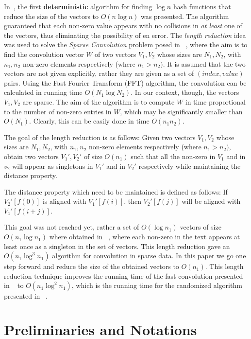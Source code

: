 \documentclass[11pt,amssymb]{article}
\begin{document}
In~\cite{LR07}, the first {\bf deterministic} algorithm for
finding $\log n$ hash functions that reduce the size of the vectors to
$O(n \log n)$ was presented. The algorithm guaranteed that each
non-zero value appears with no collisions in {\em at least} one of the
vectors, thus eliminating the possibility of en error.
The {\em length reduction} idea was used to solve the {\it Sparse
Convolution} problem posed in ~\cite{muthu-open}, where the aim is to
find the convolution vector $W$ of two vectors $V_1,V_2$ whose sizes
are $N_1,N_2$, with $n_1,n_2$ non-zero elements respectively (where
$n_1>n_2)$. It is assumed that the two vectors are not given
explicitly, rather they are given as a set of $(index,value)$
pairs. Using the Fast Fourier Transform (FFT) algorithm, the
convolution can be calculated in running time $O(N_1 \log
N_2)$\cite{CLR-92}. In our context, though, the vectors $V_1, V_2$ are
sparse. The aim of the algorithm is to compute $W$ in time
proportional to the number of non-zero entries in $W$, which may be
significantly smaller than $O(N_1)$. Clearly, this can be easily done
in time $O(n_1n_2)$.

The goal of the length reduction is as follows: Given two vectors
$V_1,V_2$ whose sizes are $N_1,N_2$, with $n_1,n_2$ non-zero
elements respectively (where $n_1>n_2)$, obtain two vectors
$V_1',V_2'$ of size $O(n_1)$ such that all the non-zero in $V_1$ and
in $v_2$ will appear as singletons in $V_1'$ and in $V_2'$
respectively while maintaining the distance property.

The distance property which need to be maintained is defined as
follows: If $V_2'[f(0)]$ is aligned with $V_1'[f(i)]$, then
$V_2'[f(j)]$ will be aligned with $V_1'[f(i+j)]$.

This goal was not reached yet, rather a set of $O(\log n_1)$ vectors
of size $O(n_1 \log n_1)$ where obtained in ~\cite{LR07}, where each
non-zero in the text appears at least once as a singleton in the set
of vectors. This length reduction gave an $O(n_1 \log^3 n_1)$
algorithm for convolution in sparse data. In this paper we go one
step forward and reduce the size of the obtained vectors to
$O(n_1)$. This length reduction technique improves the running time
of the fast convolution presented in ~\cite{LR07} to $O(n_1 \log^2
n_1)$, which is the running time for the randomized algorithm
presented in ~\cite{CH:02}.


\section{Preliminaries and Notations}\label{s:pre}
\end{document}
